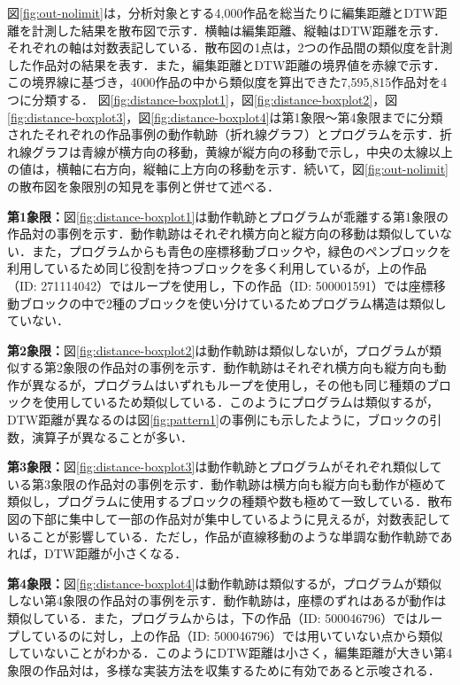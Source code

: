 \documentclass[T,J]{fose} %
\begin{document}
図\ref{fig:out-nolimit}は，分析対象とする4,000作品を総当たりに編集距離とDTW距離を計測した結果を散布図で示す．横軸は編集距離、縦軸はDTW距離を示す．それぞれの軸は対数表記している．散布図の1点は，2つの作品間の類似度を計測した作品対の結果を表す．また，編集距離とDTW距離の境界値を赤線で示す．この境界線に基づき，4000作品の中から類似度を算出できた7,595,815作品対を4つに分類する．
図\ref{fig:distance-boxplot1}，図\ref{fig:distance-boxplot2}，図\ref{fig:distance-boxplot3}，図\ref{fig:distance-boxplot4}は第1象限〜第4象限までに分類されたそれぞれの作品事例の動作軌跡（折れ線グラフ）とプログラムを示す．折れ線グラフは青線が横方向の移動，黄線が縦方向の移動で示し，中央の太線以上の値は，横軸に右方向，縦軸に上方向の移動を示す．続いて，図\ref{fig:out-nolimit}の散布図を象限別の知見を事例と併せて述べる．

\noindent\textbf{第1象限：}図\ref{fig:distance-boxplot1}は動作軌跡とプログラムが乖離する第1象限の作品対の事例を示す．動作軌跡はそれぞれ横方向と縦方向の移動は類似していない．また，プログラムからも青色の座標移動ブロックや，緑色のペンブロックを利用しているため同じ役割を持つブロックを多く利用しているが，上の作品（ID: 271114042）ではループを使用し，下の作品（ID: 500001591）では座標移動ブロックの中で2種のブロックを使い分けているためプログラム構造は類似していない．

\noindent\textbf{第2象限：}図\ref{fig:distance-boxplot2}は動作軌跡は類似しないが，プログラムが類似する第2象限の作品対の事例を示す．動作軌跡はそれぞれ横方向も縦方向も動作が異なるが，プログラムはいずれもループを使用し，その他も同じ種類のブロックを使用しているため類似している．このようにプログラムは類似するが，DTW距離が異なるのは図\ref{fig:pattern1}の事例にも示したように，ブロックの引数，演算子が異なることが多い．

\noindent\textbf{第3象限：}図\ref{fig:distance-boxplot3}は動作軌跡とプログラムがそれぞれ類似している第3象限の作品対の事例を示す．動作軌跡は横方向も縦方向も動作が極めて類似し，プログラムに使用するブロックの種類や数も極めて一致している．散布図の下部に集中して一部の作品対が集中しているように見えるが，対数表記していることが影響している．ただし，作品が直線移動のような単調な動作軌跡であれば，DTW距離が小さくなる．

\noindent\textbf{第4象限：}図\ref{fig:distance-boxplot4}は動作軌跡は類似するが，プログラムが類似しない第4象限の作品対の事例を示す．動作軌跡は，座標のずれはあるが動作は類似している．また，プログラムからは，下の作品（ID: 500046796）ではループしているのに対し，上の作品（ID: 500046796）では用いていない点から類似していないことがわかる．このようにDTW距離は小さく，編集距離が大きい第4象限の作品対は，多様な実装方法を収集するために有効であると示唆される．
\end{document}
